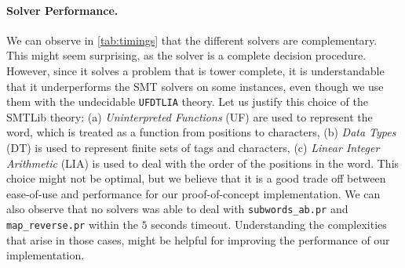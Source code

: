 \paragraph{Solver Performance.}
We can observe in \cref{tab:timings} that the different solvers are complementary.
This might seem surprising, as the  solver is a complete decision procedure. 
However, since it solves a problem that is tower complete,
it is understandable that it underperforms the SMT solvers on some instances,
even though we use them with the undecidable \texttt{UFDTLIA} theory.
Let us justify this choice of the SMTLib theory: 
(a) \emph{Uninterpreted Functions} (UF) are used to represent the word, which 
is treated as a function from positions to characters,
(b) \emph{Data Types} (DT) is used to represent finite sets of tags and characters, 
(c) \emph{Linear Integer Arithmetic} (LIA) is used to deal with the order of the 
positions in the word. This choice might not be optimal, but we believe that it
is a good trade off between ease-of-use and performance for our proof-of-concept
implementation. We can also observe that no solvers was able to deal with 
\texttt{subwords\_ab.pr} and \texttt{map\_reverse.pr} within the $5$ seconds timeout.
Understanding the complexities that arise in those cases, might be helpful
for improving the performance of our implementation.